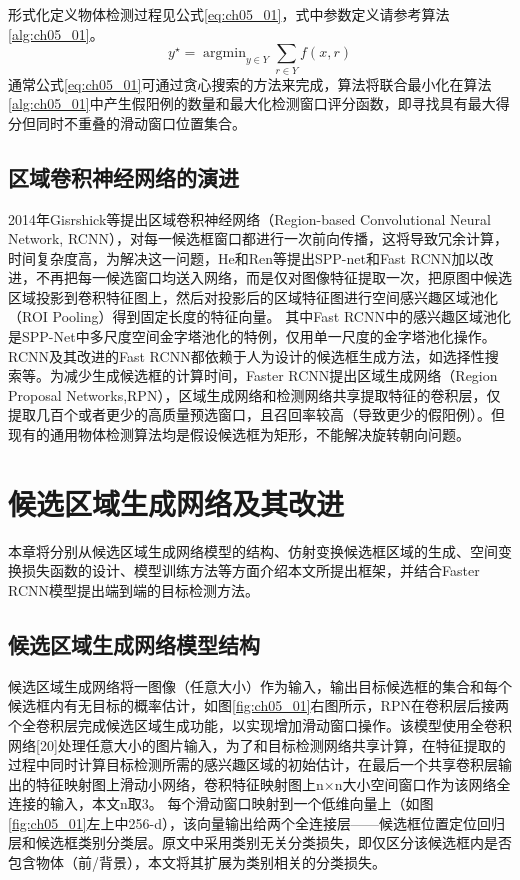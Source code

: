 形式化定义物体检测过程见公式\ref{eq:ch05_01}，式中参数定义请参考算法\ref{alg:ch05_01}。
\begin{equation} 
\label{eq:ch05_01}
      y^{\star}=\mathop{\arg\min}_{y\in Y}\sum _{r\in Y} f(x,r)
\end{equation}                               	 
通常公式\ref{eq:ch05_01}可通过贪心搜索的方法来完成，算法将联合最小化在算法\ref{alg:ch05_01}中产生假阳例的数量和最大化检测窗口评分函数，即寻找具有最大得分但同时不重叠的滑动窗口位置集合。
\subsection{区域卷积神经网络的演进}
2014年Gisrshick等\citep{Girshick2014b}提出区域卷积神经网络（Region-based Convolutional Neural Network, RCNN），对每一候选框窗口都进行一次前向传播，这将导致冗余计算，时间复杂度高，为解决这一问题，He和Ren等提出SPP-net\citep{He2015spp}和Fast RCNN\citep{Girshick2015b}加以改进，不再把每一候选窗口均送入网络，而是仅对图像特征提取一次，把原图中候选区域投影到卷积特征图上，然后对投影后的区域特征图进行空间感兴趣区域池化（ROI Pooling）得到固定长度的特征向量。
其中Fast RCNN中的感兴趣区域池化是SPP-Net中多尺度空间金字塔池化的特例，仅用单一尺度的金字塔池化操作。RCNN及其改进的Fast RCNN都依赖于人为设计的候选框生成方法，如选择性搜索等。为减少生成候选框的计算时间，Faster RCNN提出区域生成网络（Region Proposal Networks,RPN），区域生成网络和检测网络共享提取特征的卷积层，仅提取几百个或者更少的高质量预选窗口，且召回率较高（导致更少的假阳例）。但现有的通用物体检测算法均是假设候选框为矩形，不能解决旋转朝向问题。

\section{候选区域生成网络及其改进}
 
本章将分别从候选区域生成网络模型的结构、仿射变换候选框区域的生成、空间变换损失函数的设计、模型训练方法等方面介绍本文所提出框架，并结合Faster RCNN模型提出端到端的目标检测方法。

\subsection{候选区域生成网络模型结构}

候选区域生成网络将一图像（任意大小）作为输入，输出目标候选框的集合和每个候选框内有无目标的概率估计，如图\ref{fig:ch05_01}右图所示，RPN在卷积层后接两个全卷积层完成候选区域生成功能，以实现增加滑动窗口操作。该模型使用全卷积网络[20]处理任意大小的图片输入，为了和目标检测网络\citep{Girshick2015b}共享计算，在特征提取的过程中同时计算目标检测所需的感兴趣区域的初始估计，在最后一个共享卷积层输出的特征映射图上滑动小网络，卷积特征映射图上n×n大小空间窗口作为该网络全连接的输入，本文n取3。
每个滑动窗口映射到一个低维向量上（如图\ref{fig:ch05_01}左上中256-d），该向量输出给两个全连接层——候选框位置定位回归层和候选框类别分类层。原文中采用类别无关分类损失，即仅区分该候选框内是否包含物体（前/背景），本文将其扩展为类别相关的分类损失。

